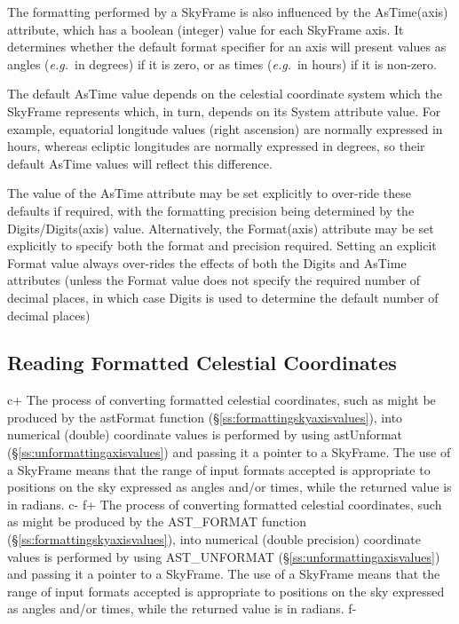 \documentclass[twoside,11pt]{starlink}
\providecommand{\secref}[1]{\S\ref{#1}}
\begin{document}
The formatting performed by a SkyFrame is also influenced by the
AsTime(axis) attribute, which has a boolean (integer) value for each
SkyFrame axis.  It determines whether the default format specifier for
an axis will present values as angles (\emph{e.g.}\ in degrees) if it
is zero, or as times (\emph{e.g.}\ in hours) if it is non-zero.

The default AsTime value depends on the celestial coordinate system
which the SkyFrame represents which, in turn, depends on its System
attribute value. For example, equatorial longitude values (right
ascension) are normally expressed in hours, whereas ecliptic
longitudes are normally expressed in degrees, so their default AsTime
values will reflect this difference.

The value of the AsTime attribute may be set explicitly to over-ride
these defaults if required, with the formatting precision being
determined by the Digits/Digits(axis) value. Alternatively, the
Format(axis) attribute may be set explicitly to specify both the
format and precision required. Setting an explicit Format value always
over-rides the effects of both the Digits and AsTime attributes (unless
the Format value does not specify the required number of decimal places,
in which case Digits is used to determine the default number of decimal
places)

\subsection{\label{ss:unformattingskyaxisvalues}Reading Formatted Celestial Coordinates}

c+
The process of converting formatted celestial coordinates, such as
might be produced by the astFormat function
(\secref{ss:formattingskyaxisvalues}), into numerical (double)
coordinate values is performed by using astUnformat
(\secref{ss:unformattingaxisvalues}) and passing it a pointer to a
SkyFrame. The use of a SkyFrame means that the range of input formats
accepted is appropriate to positions on the sky expressed as angles
and/or times, while the returned value is in radians.
c-
f+
The process of converting formatted celestial coordinates, such as
might be produced by the AST\_FORMAT function
(\secref{ss:formattingskyaxisvalues}), into numerical (double
precision) coordinate values is performed by using AST\_UNFORMAT
(\secref{ss:unformattingaxisvalues}) and passing it a pointer to a
SkyFrame. The use of a SkyFrame means that the range of input formats
accepted is appropriate to positions on the sky expressed as angles
and/or times, while the returned value is in radians.
f-
\end{document}
